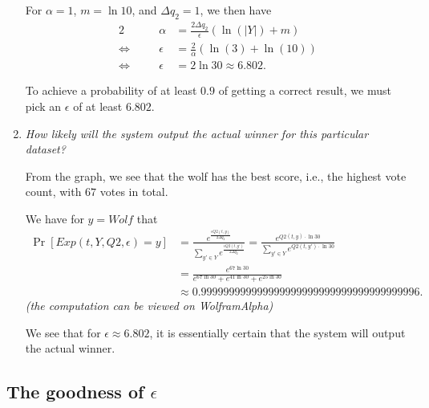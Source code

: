 \documentclass[parskip=half]{scrartcl}
\begin{document}
\begin{enumerate}
    For $\alpha = 1$, $m=\ln{10}$, and $\Delta q_2=1$, we then have
    \begin{alignat*}{2}
        \quad&& \alpha &= \frac{2\Delta q_2}{\epsilon}(\ln(|Y|) + m)\\
        \Leftrightarrow\quad&&
        \epsilon &= \frac{2}{\alpha}(\ln(3) + \ln(10))\\
        \Leftrightarrow\quad&&
        \epsilon &= 2 \ln{30} \approx 6.802.
    \end{alignat*}

    To achieve a probability of at least $0.9$ of getting a correct result, we
    must pick an $\epsilon$ of at least $6.802$.

    \item \textit{How likely will the system output the actual winner for this
    particular dataset?}

    From the graph, we see that the wolf has the best score, i.e., the highest
    vote count, with $67$ votes in total.

    We have for $y = \textit{Wolf}$ that
    \begin{align*}
        \Pr[\textit{Exp}(t, Y, Q2, \epsilon) = y] &=
        \frac{e^\frac{\epsilon Q2(t, y)}{2\Delta q_2}}
        {\sum_{y'\in Y} e^\frac{\epsilon Q2(t, y')}{2\Delta q_2}}
        =
        \frac{e^{Q2(t, y) \cdot \ln{30}}}
        {\sum_{y'\in Y} e^{Q2(t, y') \cdot \ln{30}}}\\
        &=
        \frac{e^{67\ln{30}}}
        {
            e^{67\ln{30}} +
            e^{41\ln{30}} +
            e^{25\ln{30}}
        }\\
        &\approx 0.999999999999999999999999999999999999996.
    \end{align*}
    \textit{\footnotesize(the computation can be viewed on
    WolframAlpha\footnotemark{})}

    We see that for $\epsilon\approx 6.802$, it is essentially certain that
    the system will output the actual winner.


\end{enumerate}

\subsection{The goodness of \texorpdfstring{$\epsilon$}{ε}}
\end{document}
